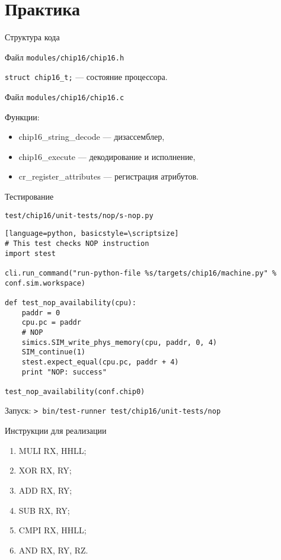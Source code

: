 \documentclass{beamer}
\begin{document}
\section{Практика}

\begin{frame}{Структура кода}

Файл \texttt{modules/chip16/chip16.h}

\texttt{struct chip16\_t;} — состояние процессора.

\pause\bigskip

Файл \texttt{modules/chip16/chip16.c}

Функции:

\begin{itemize}
    \item chip16\_string\_decode — дизассемблер,
    \item chip16\_execute — декодирование и исполнение,
    \item cr\_register\_attributes — регистрация атрибутов.
\end{itemize}

\end{frame}

\begin{frame}[fragile]{Тестирование}

\texttt{test/chip16/unit-tests/nop/s-nop.py}

\begin{verbatim}[language=python, basicstyle=\scriptsize]
# This test checks NOP instruction
import stest

cli.run_command("run-python-file %s/targets/chip16/machine.py" % conf.sim.workspace)

def test_nop_availability(cpu):
    paddr = 0
    cpu.pc = paddr
    # NOP
    simics.SIM_write_phys_memory(cpu, paddr, 0, 4)
    SIM_continue(1)
    stest.expect_equal(cpu.pc, paddr + 4)
    print "NOP: success"

test_nop_availability(conf.chip0)
\end{verbatim}

Запуск: \texttt{> bin/test-runner test/chip16/unit-tests/nop}
\end{frame}

\begin{frame}{Инструкции для реализации}
\begin{enumerate}
    \item MULI RX, HHLL;
    \item XOR RX, RY;
    \item ADD RX, RY;
    \item SUB RX, RY;
    \item CMPI RX, HHLL;
    \item AND RX, RY, RZ.
\end{enumerate}
\end{frame}
\end{document}
